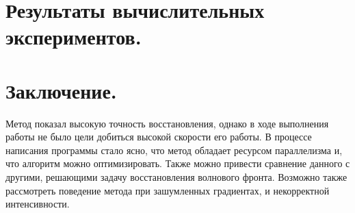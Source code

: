 \documentclass[oneside, final, 14pt]{article}
\begin{document}
\section{Результаты вычислительных экспериментов.}
\section{Заключение.}
Метод показал высокую точность восстановления, однако в ходе выполнения работы не было цели добиться высокой скорости его работы. В процессе написания программы стало ясно, что метод обладает ресурсом параллелизма и, что алгоритм можно оптимизировать. Также можно привести сравнение данного с другими, решающими задачу восстановления волнового фронта. Возможно также рассмотреть поведение метода при зашумленных градиентах, и некорректной интенсивности.

\end{document}
